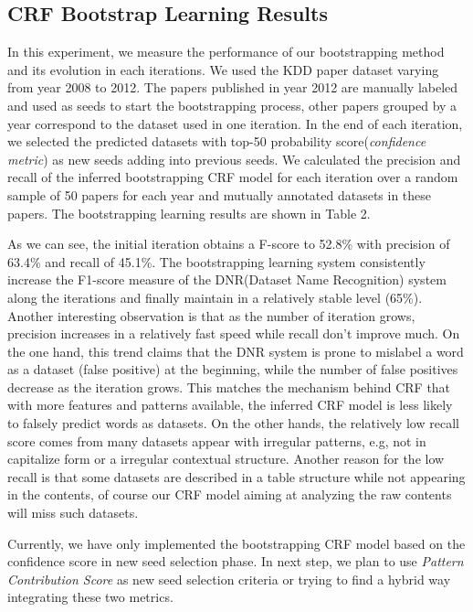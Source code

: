 \documentclass[10pt]{article}
\begin{document}
\subsection{CRF Bootstrap Learning Results}
In this experiment, we measure the performance of our bootstrapping method and its evolution in each iterations. We used the KDD paper dataset varying from year 2008 to 2012. The papers published in year 2012 are manually labeled and used as seeds to start the bootstrapping process, other papers grouped by a year correspond to the dataset used in one iteration. In the end of each iteration, we selected the predicted datasets with top-50 probability score(\emph{confidence metric}) as new seeds adding into previous seeds. We calculated the precision and recall of the inferred bootstrapping CRF model for each iteration over a random sample of 50 papers for each year and mutually annotated datasets in these papers. The bootstrapping learning results are shown in Table 2. 

As we can see, the initial iteration obtains a F-score to 52.8\% with precision of 63.4\% and recall of 45.1\%. The bootstrapping learning system consistently increase the F1-score measure of the DNR(Dataset Name Recognition) system along the iterations and finally maintain in a relatively stable level (65\%). Another interesting observation is that as the number of iteration grows, precision increases in a relatively fast speed while recall don't improve much. On the one hand, this trend claims that the DNR system is prone to mislabel a word as a dataset (false positive) at the beginning, while the number of false positives decrease as the iteration grows. This matches the mechanism behind CRF that with more features and patterns available, the inferred CRF model is less likely to falsely predict words as datasets. On the other hands, the relatively low recall score comes from many datasets appear with irregular patterns, e.g, not in capitalize form or a irregular contextual structure. Another reason for the low recall is that some datasets are described in a table structure while not appearing in the contents, of course our CRF model aiming at analyzing the raw contents will miss such datasets.

Currently, we have only implemented the bootstrapping CRF model based on the confidence score in new seed selection phase. In next step, we plan to use \emph{Pattern Contribution Score} as new seed selection criteria or trying to find a hybrid way integrating these two metrics.
\end{document}
